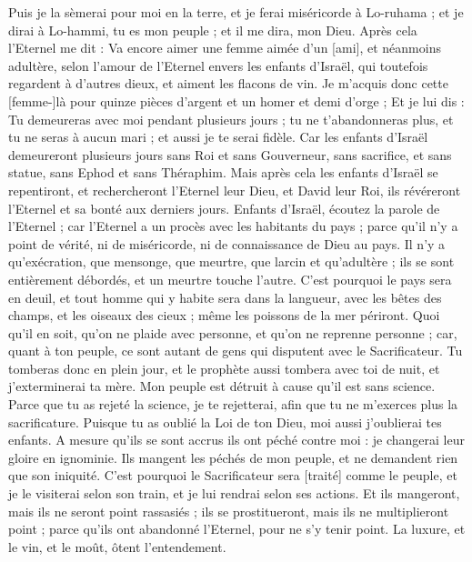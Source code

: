 \begin{multicols}{2}
Puis je la sèmerai pour moi en la terre, et je ferai miséricorde à Lo-ruhama ; et je dirai à Lo-hammi, tu es mon peuple ; et il me dira, mon Dieu.
\VerseOne{}Après cela l'Eternel me dit : Va encore aimer une femme aimée d'un [ami], et néanmoins adultère, selon l'amour de l'Eternel envers les enfants d'Israël, qui toutefois regardent à d'autres dieux, et aiment les flacons de vin.
Je m'acquis donc cette [femme-]là pour quinze pièces d'argent et un homer et demi d'orge ;
Et je lui dis : Tu demeureras avec moi pendant plusieurs jours ; tu ne t'abandonneras plus, et tu ne seras à aucun mari ; et aussi je te serai fidèle.
Car les enfants d'Israël demeureront plusieurs jours sans Roi et sans Gouverneur, sans sacrifice, et sans statue, sans Ephod et sans Théraphim.
Mais après cela les enfants d'Israël se repentiront, et rechercheront l'Eternel leur Dieu, et David leur Roi, ils révéreront l'Eternel et sa bonté aux derniers jours.
\VerseOne{}Enfants d'Israël, écoutez la parole de l'Eternel ; car l'Eternel a un procès avec les habitants du pays ; parce qu'il n'y a point de vérité, ni de miséricorde, ni de connaissance de Dieu au pays.
Il n'y a qu'exécration, que mensonge, que meurtre, que larcin et qu'adultère ; ils se sont entièrement débordés, et un meurtre touche l'autre.
C'est pourquoi le pays sera en deuil, et tout homme qui y habite sera dans la langueur, avec les bêtes des champs, et les oiseaux des cieux ; même les poissons de la mer périront.
Quoi qu'il en soit, qu'on ne plaide avec personne, et qu'on ne reprenne personne ; car, quant à ton peuple, ce sont autant de gens qui disputent avec le Sacrificateur.
Tu tomberas donc en plein jour, et le prophète aussi tombera avec toi de nuit, et j'exterminerai ta mère.
Mon peuple est détruit à cause qu'il est sans science. Parce que tu as rejeté la science, je te rejetterai, afin que tu ne m'exerces plus la sacrificature. Puisque tu as oublié la Loi de ton Dieu, moi aussi j'oublierai tes enfants.
A mesure qu'ils se sont accrus ils ont péché contre moi : je changerai leur gloire en ignominie.
Ils mangent les péchés de mon peuple, et ne demandent rien que son iniquité.
C'est pourquoi le Sacrificateur sera [traité] comme le peuple, et je le visiterai selon son train, et je lui rendrai selon ses actions.
Et ils mangeront, mais ils ne seront point rassasiés ; ils se prostitueront, mais ils ne multiplieront point ; parce qu'ils ont abandonné l'Eternel, pour ne s'y tenir point.
La luxure, et le vin, et le moût, ôtent l'entendement.

\end{multicols}
